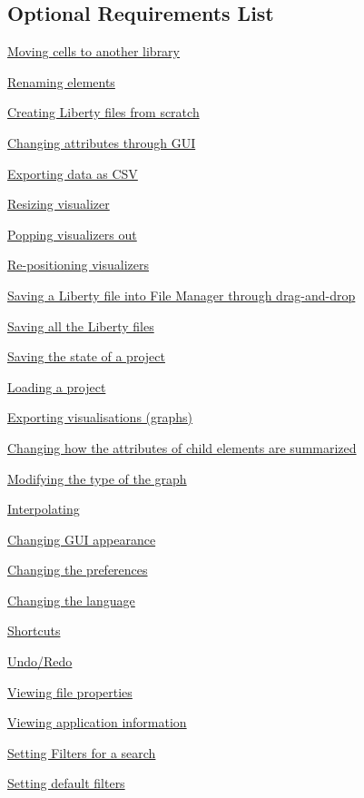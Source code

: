 \documentclass[10pt,a4paper]{report}
\newcommand{\refer}[2]{\hyperref[#1]{\textcolor{col:reference}{#2}}}
\begin{document}
\subsection{Optional Requirements List}
\begin{FRO}
    \item \refer{FRO-1}{Moving cells to another library}
    \item \refer{FRO-2}{Renaming elements}
    \item \refer{FRO-3}{Creating Liberty files from scratch}
    \item \refer{FRO-4}{Changing attributes through GUI}
    \item \refer{FRO-5}{Exporting data as CSV}
    \item \refer{FRO-6}{Resizing visualizer}
    \item \refer{FRO-7}{Popping visualizers out}
    \item \refer{FRO-8}{Re-positioning visualizers}
    \item \refer{FRO-9}{Saving a Liberty file into File Manager through drag-and-drop}
    \item \refer{FRO-10}{Saving all the Liberty files} 
    \item \refer{FRO-11}{Saving the state of a project}
    \item \refer{FRO-12}{Loading a project}
    \item \refer{FRO-13}{Exporting visualisations (graphs)}
    \item \refer{FRO-14}{Changing how the attributes of child elements are summarized}
    \item \refer{FRO-15}{Modifying the type of the graph}
    \item \refer{FRO-16}{Interpolating}
    \item \refer{FRO-17}{Changing GUI appearance}
    \item \refer{FRO-18}{Changing the preferences}
    \item \refer{FRO-19}{Changing the language}
    \item \refer{FRO-20}{Shortcuts}
    \item \refer{FRO-21}{Undo/Redo}
    \item \refer{FRO-22}{Viewing file properties}
    \item \refer{FRO-23}{Viewing application information} %
    \item \refer{FRO-24}{Setting Filters for a search}
    \item \refer{FRO-25}{Setting default filters}
\end{FRO}
\newpage
\end{document}
